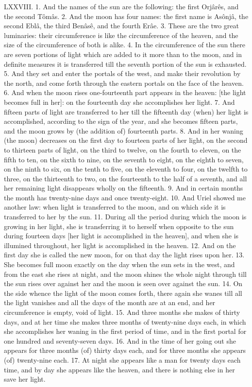 LXXVIII. 1. And the names of the sun are the
following: the first Orjârês, and the second Tômâs.
2. And the moon has four names: the first name is
Asônjâ, the second Eblâ, the third Benâsê, and the
fourth Erâe. 3. These are the two great luminaries:
their circumference is like the circumference of the
heaven, and the size of the circumference of both is
alike. 4. In the circumference of the sun there are
seven portions of light which are added to it more than
to the moon, and in definite measures it is transferred
till the seventh portion of the sun is exhausted. 5. And
they set and enter the portals of the west, and make
their revolution by the north, and come forth through
the eastern portals on the face of the heaven. 6. And
when the moon rises one-fourteenth part appears in
the heaven: [the light becomes full in her]: on the
fourteenth day she accomplishes her light. 7. And
fifteen parts of light are transferred to her till the
fifteenth day (when) her light is accomplished, according
to the sign of the year, and she becomes fifteen
parts, and the moon grows by (the addition of)
fourteenth parts. 8. And in her waning (the moon)
decreases on the first day to fourteen parts of her
light, on the second to thirteen parts of light, on the
third to twelve, on the fourth to eleven, on the fifth
to ten, on the sixth to nine, on the seventh to eight,
on the eighth to seven, on the ninth to six, on the
tenth to five, on the eleventh to four, on the twelfth
to three, on the thirteenth to two, on the fourteenth
to the half of a seventh, and all her remaining light
disappears wholly on the fifteenth. 9. And in certain
months the month has twenty-nine days and once
twenty-eight. 10. And Uriel showed me another
law: when light is transferred to the moon, and on
which side it is transferred to her by the sun. 11. During
all the period during which the moon is growing
in her light, she is transferring it to herself when
opposite to the sun during fourteen days [her light
is accomplished in the heaven], and when she is
illumined throughout, her light is accomplished in
the heaven. 12. And on the first day she is called
the new moon, for on that day the light rises upon
her. 13. She becomes full moon exactly on the day
when the sun sets in the west, and from the east she
rises at night, and the moon shines the whole night
through till the sun rises over against her and the
moon is seen over against the sun. 14. On the side
whence the light of the moon comes forth, there
again she wanes till all the light vanishes and all the
days of the month are at an end, and her circumference
is empty, void of light. 15. And three months
she makes of thirty days, and at her time she makes
three months of twenty-nine days each, in which she
accomplishes her waning in the first period of time,
and in the first portal for one hundred and seventy-seven
days. 16. And in the time of her going out
she appears for three months (of) thirty days each,
and for three months she appears (of) twenty-nine
each. 17. At night she appears like a man for
twenty days each time, and by day she appears like
the heaven, and there is nothing else in her save her
light.

